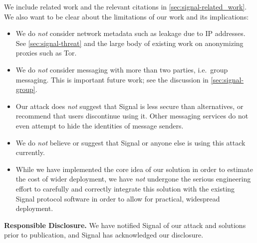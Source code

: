 We include related work and the relevant citations in \cref{sec:signal-related_work}.  We also want to be clear about the limitations of our work and its implications:
\begin{itemize}[nosep]
  \item We do \emph{not} consider network metadata such as leakage due
    to IP addresses. See \cref{sec:signal-threat} and the large body of existing
    work on anonymizing proxies such as Tor.
  \item We do \emph{not} consider messaging with more than two parties,
    i.e.\ group messaging. This is important future work; see the
    discussion in \cref{sec:signal-group}.
  \item Our attack does \emph{not} suggest that Signal is less secure
    than alternatives, or recommend that users discontinue using it.
    Other messaging services do not even attempt to hide
    the identities of message senders.
  \item We do \emph{not} believe or suggest that Signal or anyone else is using this attack
          currently.
  \item While we have implemented the core idea of our solution in order
    to estimate the cost of wider deployment, we have \emph{not}
    undergone the serious engineering effort to carefully and correctly integrate this
    solution with the existing Signal protocol software in order to
    allow for practical, widespread deployment.
\end{itemize}
\vspace{4pt}

\noindent
\textbf{Responsible Disclosure.} We have notified Signal of our attack and solutions prior to publication, and Signal has acknowledged our disclosure.


